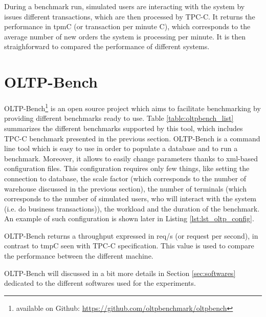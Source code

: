 During a benchmark run, simulated users are interacting with the system by issues different transactions, which are then processed by TPC-C.
It returns the performance in tpmC (or transaction per minute C), which corresponds to the average number of new orders the system is processing per minute.
It is then straighforward to compared the performance of different systems.



\section{OLTP-Bench}
OLTP-Bench\footnote{available on Github: \url{https://github.com/oltpbenchmark/oltpbench}} is an open source project which aims to facilitate benchmarking by providing different benchmarks ready to use. 
Table \ref{table:oltpbench_list} summarizes the different benchmarks supported by this tool, which includes TPC-C benchmark presented in the previous section.
OLTP-Bench is a command line tool which is easy to use in order to populate a database and to run a benchmark.
Moreover, it allows to easily change parameters thanks to xml-based configuration files.
This configuration requires only few things, like setting the connection to database, the scale factor (which corresponds to the number of warehouse discussed in the previous section), the number of terminals (which corresponds to the number of simulated users, who will interact with the system (i.e. do business transactions)), the workload and the duration of the benchmark.
An example of such configuration is shown later in Listing \ref{lst:lst_oltp_config}.

OLTP-Bench returns a throughput expressed in req/s (or request per second), in contrast to tmpC seen with TPC-C specification.
This value is used to compare the performance between the different machine.

OLTP-Bench will discussed in a bit more details in Section \ref{sec:softwares} dedicated to the different softwares used for the experiments.

